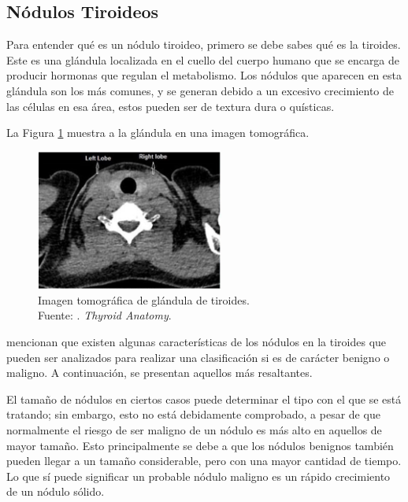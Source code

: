 \subsection{Nódulos Tiroideos}
Para entender qué es un nódulo tiroideo, primero se debe sabes qué es la tiroides. Este es una glándula localizada en el cuello del cuerpo humano que se encarga de producir hormonas que regulan el metabolismo. Los nódulos que aparecen en esta glándula son los más comunes, y se generan debido a un excesivo crecimiento de las células en esa área, estos pueden ser de textura dura o quísticas. \parencite{pr_deng2022autclass}

La Figura \ref{2:fig207} muestra a la glándula en una imagen tomográfica.

\begin{figure}[H]
	\begin{center}
		\includegraphics[width=0.55\textwidth]{2/figures/gland_thyroid.png}
		\caption[Imagen tomográfica de glándula de tiroides]{Imagen tomográfica de glándula de tiroides. \\
		Fuente: \cite{pr_binboga2019thyroid}. \textit{Thyroid Anatomy}.}
		\label{2:fig207}
	\end{center}
\end{figure}

\cite{pr_shin2016ultradiag} mencionan que existen algunas características de los nódulos en la tiroides que pueden ser analizados para realizar una clasificación si es de carácter benigno o maligno. A continuación, se presentan aquellos más resaltantes.

El tamaño de nódulos en ciertos casos puede determinar el tipo con el que se está tratando; sin embargo, esto no está debidamente comprobado, a pesar de que normalmente el riesgo de ser maligno de un nódulo es más alto en aquellos de mayor tamaño. Esto principalmente se debe a que los nódulos benignos también pueden llegar a un tamaño considerable, pero con una mayor cantidad de tiempo. Lo que sí puede significar un probable nódulo maligno es un rápido crecimiento de un nódulo sólido.

